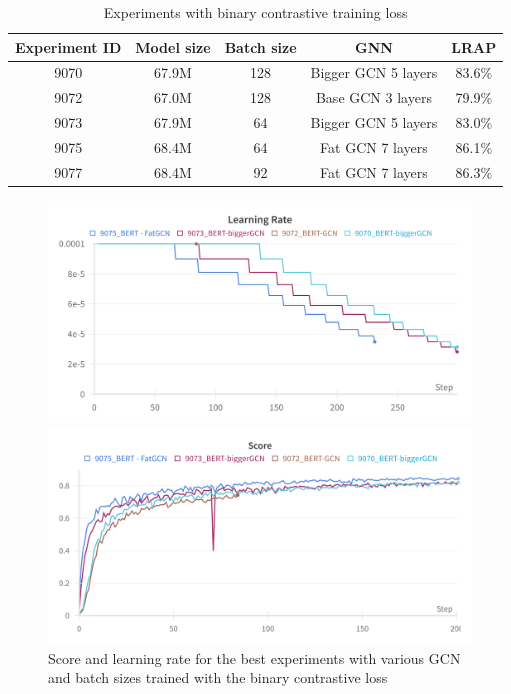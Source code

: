 \begin{table}[!]
    \centering
    \begin{tabular}{|c|c|c|c|c|}
    \hline
    \textbf{Experiment ID} & \textbf{Model size} & \textbf{Batch size} &\textbf{GNN} & \textbf{LRAP} \\ \hline
    9070         & 67.9M & 128      & Bigger GCN 5 layers  & 83.6\%      \\ \hline
     9072      & 67.0M  &  128      & Base GCN 3 layers  & 79.9\%  \\ \hline
     9073        & 67.9M &  64      & Bigger GCN 5 layers  & 83.0\%     \\ \hline
     9075     &68.4M   &  64     & Fat GCN 7 layers  & 86.1\% \\ \hline
      9077     & 68.4M  &  92     & Fat GCN 7 layers  & 86.3\% \\ \hline
    \end{tabular}
    \caption{Experiments with binary contrastive training loss}
    \label{tab:best_new_loss}
\end{table}

\begin{figure}
\centering
\begin{minipage}{0.4\textwidth}
\includegraphics[width=\textwidth]{figures/9070_lr.png}
\end{minipage}
\hfill
\begin{minipage}{0.4\textwidth}
\includegraphics[width=\textwidth]{figures/9070_score.png}   
\end{minipage}
\caption{Score and learning rate for the best experiments with various GCN and batch sizes trained with the binary contrastive loss}
\label{fig:best_new_loss}
\end{figure}

